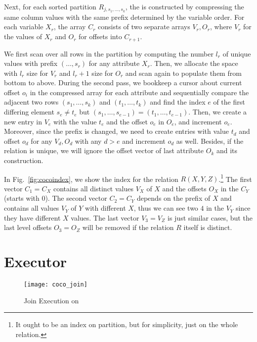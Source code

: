 Next, for each sorted partition $R_{j, s_1, ..., s_k}$, the
\indexlayout is constructed by compressing the same column values with
the same prefix determined by the variable order.  For each variable
$X_r$, the array $C_r$ consists of two separate arrays $V_r, O_r$,
where $V_r$ for the values of $X_r$ and $O_r$ for offsets into
$C_{r+1}$.  

We first scan over all rows in the partition by computing
the number $l_r$ of unique values with prefix $(\ldots, s_r)$ for any
attribute $X_r$. Then, we allocate the space with $l_r$ size for $V_r$
and $l_{r}+1$ size for $O_r$ and scan again to populate them from
bottom to above. During the second pass, we bookkeep a cursor about
current offset $o_i$ in the compressed array for each attribute and
sequentially compare the adjacent two rows $(s_1, \ldots, s_{k})$ and
$(t_1, \ldots, t_{k})$ and find the index $e$ of the first differing
element $s_e \neq t_e$ but
$(s_1, \ldots, s_{e-1}) = (t_1, \ldots, t_{e-1})$. Then, we create a
new entry in $V_e$ with the value $t_e$ and the offset $o_e$ in $O_e$,
and increment $o_e$. Moreover, since the prefix is changed, we need to
create entries with value $t_d$ and offset $o_d$ for any $V_d, O_d$
with any $d > e$ and increment $o_d$ as well.  Besides, if the
relation is unique, we will ignore the offset vector of last attribute
$O_k$ and its construction.

\begin{example}
  In Fig.~\ref{fig:cocoindex}, we show the \indexlayout index for the relation $R(X, Y, Z)$.\footnote{It ought to be an index on partition, but for simplicity, just on the whole relation.} 
  The first vector $C_1 = C_X$ contains all distinct values $V_X$ of $X$ and the offsets $O_X$ in the $C_Y$ (starts with $0$). The second vector $C_2 = C_Y$ depends on the prefix of $X$ and contains all values $V_Y$ of $Y$ with different $X$, thus we can see two $4$ in the $V_Y$ since they have different $X$ values. 
  The last vector $V_3 = V_Z$ is just similar cases, but the last level offsets $O_3 = O_Z$ will be removed if the relation $R$ itself is distinct.
\end{example}

\section{Executor}

\label{sec:join}

\begin{figure}[t]
  \centering
  \texttt{[image: coco\_join]}
  \caption{Join Execution on \indexlayout}
  \label{fig:cocojoin}
\end{figure}

